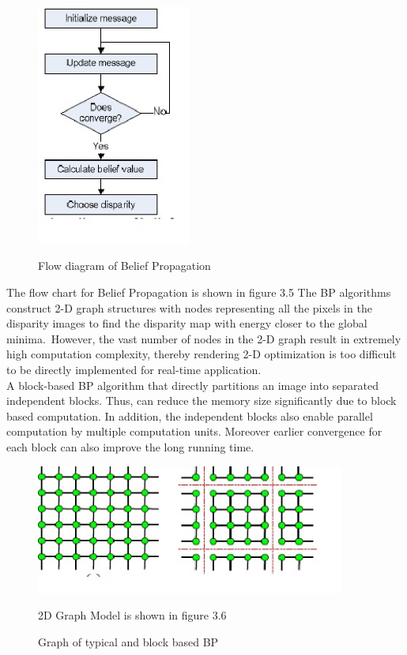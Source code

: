 \begin{figure}
  \includegraphics[width=2in]{block1.eps}\\
  \caption{Flow diagram of Belief Propagation}\label{}
\end{figure}
The flow chart  for Belief Propagation is shown in figure 3.5
 The BP algorithms construct 2-D graph structures with nodes representing all the pixels in the disparity images to find the disparity map with energy closer to the global minima.\ However, the vast number of nodes in the 2-D graph  result in  extremely high computation complexity, thereby rendering 2-D optimization is too difficult to be directly implemented for real-time application.\\
A block-based BP algorithm that directly partitions an image into separated independent blocks. Thus, can reduce the memory size significantly due to block based computation. In addition, the independent blocks also enable parallel computation by multiple computation units. Moreover earlier convergence for each block can also improve the long running time.


\begin{figure}
 \includegraphics[width=4in]{block2.eps}\\
  \caption{Graph of typical and block based BP}\label{}
2D Graph Model is shown in figure 3.6
\end{figure}

